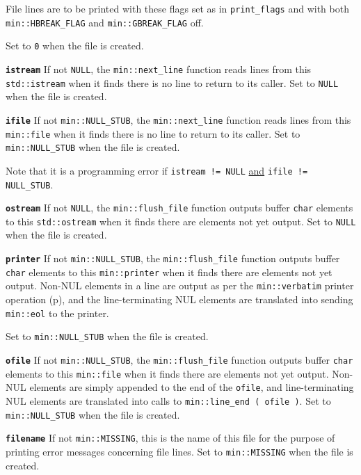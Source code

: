 \documentclass[12pt]{article}
\makeatletter
\newcommand{\ttmkey}[2]{{\tt \bf #1}\index{#1@{\tt #1}!#2}}
\newcommand{\pagref}[1]{p\pageref{#1}}
\newcommand{\EOL}{\penalty \exhyphenpenalty}
\newenvironment{itemlist}[1][1.2in]%
	{\begin{list}{}{\setlength{\labelwidth}{#1}%
		        \setlength{\leftmargin}{\labelwidth}%
		        \addtolength{\leftmargin}{+0.2in}%
		        \renewcommand{\makelabel}[1]{##1\hfill}}}%
	{\end{list}}
\makeatother
\begin{document}
\begin{itemlist}[1.4in]
File lines are to be printed with these
flags set as in {\tt print\_\EOL flags} and with
both {\tt min::\EOL HBREAK\_\EOL FLAG} and {\tt min::\EOL GBREAK\_\EOL FLAG}
off.

Set to {\tt 0} when the file is created.

\item[\ttmkey{istream}{in {\tt min::file}}]
If not {\tt NULL}, the {\tt min::\EOL next\_\EOL line} function
reads lines from this {\tt std::\EOL istream} when it finds
there is no line to return to its caller.
Set to {\tt NULL} when the file is created.

\item[\ttmkey{ifile}{in {\tt min::file}}]
If not {\tt min::NULL\_STUB}, the {\tt min::\EOL next\_\EOL line} function
reads lines from this {\tt min::\EOL file} when it finds
there is no line to return to its caller.
Set to {\tt min::\EOL NULL\_\EOL STUB} when the file is created.

Note that it is a programming error if {\tt istream != NULL}
\underline{and} {\tt ifile != NULL\_\EOL STUB}.

\item[\ttmkey{ostream}{in {\tt min::file}}]
If not {\tt NULL}, the {\tt min::\EOL flush\_\EOL file} function
outputs buffer {\tt char} elements to this {\tt std::\EOL ostream} when it finds
there are elements not yet output.
Set to {\tt NULL} when the file is created.

\item[\ttmkey{printer}{in {\tt min::file}}]
If not {\tt min::NULL\_STUB}, the {\tt min::\EOL flush\_\EOL file} function
outputs buffer {\tt char} elements
to this {\tt min::\EOL printer} when it finds
there are elements not yet output.
Non-NUL elements in a
line are output as per the {\tt min::\EOL verbatim}
printer operation (\pagref{MIN::VERBATIM}),
and the line-terminating
NUL elements are translated into sending {\tt min::eol} to the printer.

Set to {\tt min::\EOL NULL\_\EOL STUB} when the file is created.

\item[\ttmkey{ofile}{in {\tt min::file}}]
If not {\tt min::NULL\_STUB}, the {\tt min::\EOL flush\_\EOL file} function
outputs buffer {\tt char} elements to this {\tt min::\EOL file} when it finds
there are elements not yet output.
Non-NUL elements are simply appended to the end of the {\tt ofile}, and
line-terminating NUL elements are translated into calls to
{\tt min::\EOL line\_\EOL end~(~ofile~)}.
Set to {\tt min::\EOL NULL\_\EOL STUB} when the file is created.

\item[\ttmkey{filename}{in {\tt min::file}}]
If not {\tt min::MISSING}, this
is the name of this file for the purpose of printing error messages
concerning file lines.
Set to {\tt min::\EOL MISSING} when the file is created.

\end{itemlist}
\end{document}
